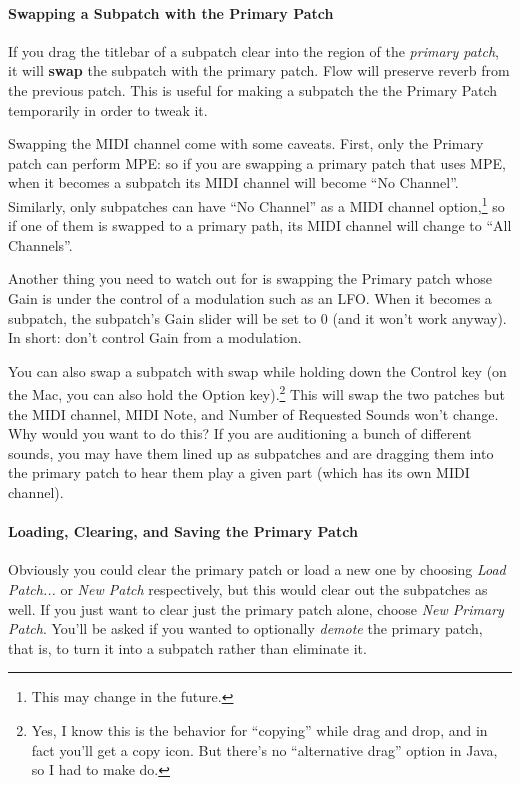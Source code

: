 \documentclass{article}
\begin{document}
\paragraph{Swapping a Subpatch with the Primary Patch}

If you drag the titlebar of a subpatch clear into the region of the {\it primary patch}, it will {\bf swap} the subpatch with the primary patch.  Flow will preserve reverb from the previous patch.  This is useful for making a subpatch the the Primary Patch temporarily in order to tweak it.

Swapping the MIDI channel come with some caveats.  First, only the Primary patch can perform MPE: so if you are swapping a primary patch that uses MPE, when it becomes a subpatch its MIDI channel will become ``No Channel''.  Similarly, only subpatches can have ``No Channel'' as a MIDI channel option,\footnote{This may change in the future.} so if one of them is swapped to a primary path, its MIDI channel will change to ``All Channels''.

Another thing you need to watch out for is swapping the Primary patch whose Gain is under the control of a modulation such as an LFO.  When it becomes a subpatch, the subpatch's Gain slider will be set to 0 (and it won't work anyway).  In short: don't control Gain from a modulation.

You can also swap a subpatch with  swap while holding down the Control key (on the Mac, you can also hold the Option key).\footnote{Yes, I know this is the behavior for ``copying'' while drag and drop, and in fact you'll get a copy icon.  But there's no ``alternative drag'' option in Java, so I had to make do.}  This will swap the two patches but the MIDI channel, MIDI Note, and Number of Requested Sounds won't change.  Why would you want to do this?  If you are auditioning a bunch of different sounds, you may have them lined up as subpatches and are dragging them into the primary patch to hear them play a given part (which has its own MIDI channel).

\paragraph{Loading, Clearing, and Saving the Primary Patch}  Obviously you could clear the primary patch or load a new one by choosing {\it Load Patch...} or {\it New Patch} respectively, but this would clear out the subpatches as well.  If you just want to clear just the primary patch alone, choose {\it New Primary Patch}.  You'll be asked if you wanted to optionally {\it demote} the primary patch, that is, to turn it into a subpatch rather than eliminate it. 
\end{document}
